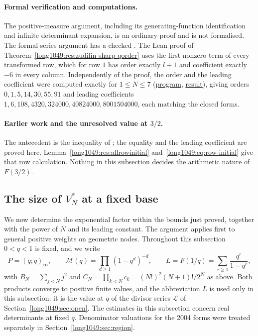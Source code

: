 \documentclass[11pt]{article}
\begin{document}
\paragraph{Formal verification and computations.}
The positive-measure argument, including its generating-function
identification and infinite determinant expansion, is an ordinary proof
and is not formalised. The formal-series argument has a checked
.
The Lean proof of Theorem~\ref{long1049:res:zudilin-sharp-qorder} uses
the first nonzero term of every transformed row, which
for row $1$ has order exactly $l+1$ and coefficient exactly $-6$ in every
column.  Independently of the proof, the order and the
leading coefficient were computed exactly for $1\le N\le7$
(\href{https://github.com/wcook04/plectis-erdos/blob/f5c9e560df38cd32e9b49473a409384aab00d9ae/research/experiments/erdos1049/hankel_qorder.py}{program}, \href{https://github.com/wcook04/plectis-erdos/blob/f5c9e560df38cd32e9b49473a409384aab00d9ae/research/experiments/erdos1049/receipts/hankel-qorder.json}{result}), giving orders
$0,1,5,14,30,55,91$ and leading coefficients
$1,6,108,4320,324000,40824000,8001504000$, each matching the closed forms.

\paragraph{Earlier work and the unresolved value at $3/2$.}
The antecedent is the inequality of \cite[Sec.~4, p.~7]{zudilin2016}; the equality and
the leading coefficient are proved here.
Lemma~\ref{long1049:res:allrowinitial} and~\eqref{long1049:eq:row-initial}
give that row calculation.  Nothing in
this subsection decides the arithmetic nature of $F(3/2)$.


\subsection{The size of \texorpdfstring{$V_N^*$}{V(N)} at a fixed base}
\label{long1049:sec:sharp-fixed-base}

We now determine the exponential factor within the bounds just
proved, together with the power of $N$ and its leading constant.
The argument applies first to general positive weights on geometric
nodes. Throughout this subsection $0<q<1$ is fixed, and we write
\[
 P=(q;q)_\infty,\qquad
 \mathcal M(q)=\prod_{d\ge1}(1-q^d)^{-d},\qquad
 L=F(1/q)=\sum_{r\ge1}\frac{q^r}{1-q^r},
\]
with $B_N=\sum_{j<N}j^2$ and $C_N=\prod_{k<N}c_k=(N!)^2(N+1)!/2^N$ as above.
Both products converge to positive finite values, and the abbreviation $L$ is
used only in this subsection; it is the value at $q$ of the divisor series
$\mathcal L$ of Section~\ref{long1049:sec:open}.
The estimates in this subsection concern real determinants at fixed
$q$. Denominator valuations for the 2004 forms were treated separately
in Section~\ref{long1049:sec:region}.
\end{document}
